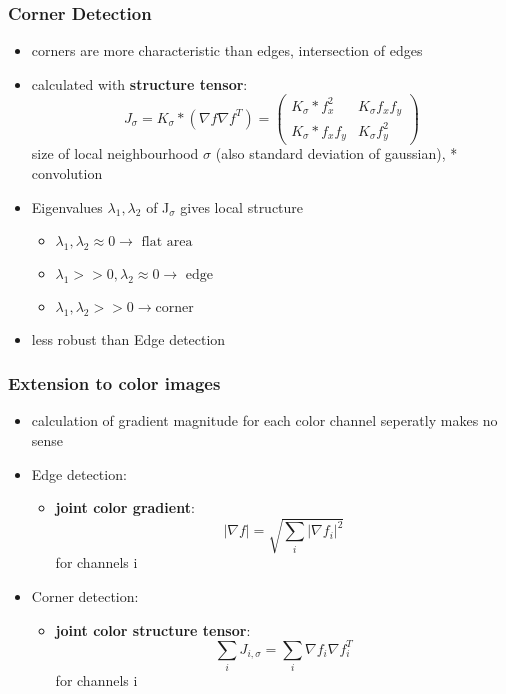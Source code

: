 \documentclass[11pt]{article}
\begin{document}
\subsubsection{Corner Detection}
\label{sec-2-3-2}
\begin{itemize}
\item corners are more characteristic than edges, intersection of edges
\item calculated with \textbf{structure tensor}:
     \[ J_\sigma = K_\sigma * (\nabla f \nabla f^T) = \begin{pmatrix}
       K_\sigma*f_x^2 & K_\sigma f_xf_y \\
       K_\sigma*f_xf_y & K_\sigma f_y^2 \end{pmatrix}
     \]
size of local neighbourhood $\sigma$ (also standard deviation of gaussian), * convolution
\item Eigenvalues $\lambda_1, \lambda_2$ of J$_{\sigma}$ gives local structure
\begin{itemize}
\item \(\lambda_1, \lambda_2 \approx 0 \rightarrow \text{ flat area}\)
\item \(\lambda_1 >> 0, \lambda_2 \approx 0 \rightarrow \text{ edge}\)
\item \(\lambda_1, \lambda_2 >> 0 \rightarrow \text{corner} \)
\end{itemize}
\item less robust than Edge detection
\end{itemize}
\subsubsection{Extension to color images}
\label{sec-2-3-3}
\begin{itemize}
\item calculation of gradient magnitude for each color channel seperatly makes no sense
\item Edge detection:
\begin{itemize}
\item \textbf{joint color gradient}:
\[ |\nabla f| = \sqrt{\sum_{i}|\nabla f_i|^2} \]
for channels i
\end{itemize}
\item Corner detection:
\begin{itemize}
\item \textbf{joint color structure tensor}:
\[ \sum_{i} J_{i,\sigma} = \sum_{i} \nabla f_i \nabla f_i^T \]
for channels i
\end{itemize}
\end{itemize}
\end{document}
